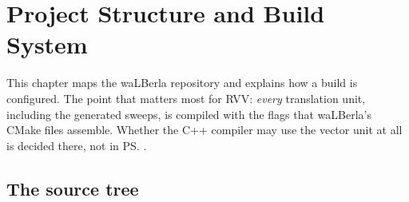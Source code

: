 \chapter{Project Structure and Build System}\label{r02:ch:structure}

This chapter maps the waLBerla repository and explains how a build is configured. The
point that matters most for RVV: \emph{every} translation unit, including the generated
sweeps, is compiled with the flags that waLBerla's CMake files assemble. Whether the
C++ compiler may use the vector unit at all is decided there, not in \ps{}.

\section{The source tree}\label{r02:sec:tree}

